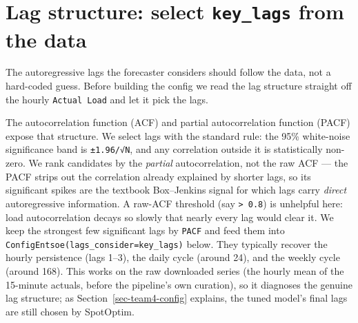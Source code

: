 \documentclass[
  english,
  letterpaper,
]{scrbook}
\begin{document}
\section{\texorpdfstring{Lag structure: select \texttt{key\_lags} from
the
data}{Lag structure: select key\_lags from the data}}\label{sec-team4-lags}

The autoregressive lags the forecaster considers should follow the data,
not a hard-coded guess. Before building the config we read the lag
structure straight off the hourly \texttt{Actual\ Load} and let it pick
the lags.

The autocorrelation function (ACF) and partial autocorrelation function
(PACF) expose that structure. We select lags with the standard rule: the
95\% white-noise significance band is \texttt{±1.96/√N}, and any
correlation outside it is statistically non-zero. We rank candidates by
the \emph{partial} autocorrelation, not the raw ACF --- the PACF strips
out the correlation already explained by shorter lags, so its
significant spikes are the textbook Box--Jenkins signal for which lags
carry \emph{direct} autoregressive information. A raw-ACF threshold (say
\texttt{\textgreater{}\ 0.8}) is unhelpful here: load autocorrelation
decays so slowly that nearly every lag would clear it. We keep the
strongest few significant lags by \texttt{\textbar{}PACF\textbar{}} and
feed them into \texttt{ConfigEntsoe(lags\_consider=key\_lags)} below.
They typically recover the hourly persistence (lags 1--3), the daily
cycle (around 24), and the weekly cycle (around 168). This works on the
raw downloaded series (the hourly mean of the 15-minute actuals, before
the pipeline's own curation), so it diagnoses the genuine lag structure;
as Section~\ref{sec-team4-config} explains, the tuned model's final lags
are still chosen by SpotOptim.
\end{document}
